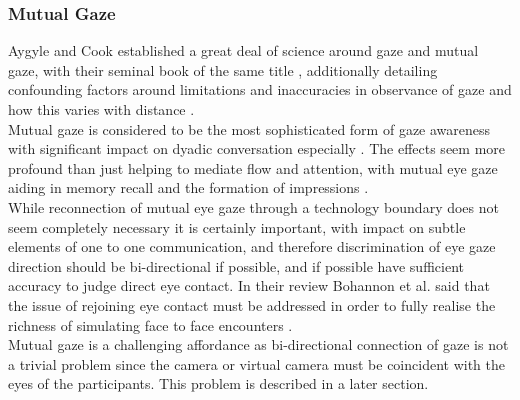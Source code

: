 \subsubsection{Mutual Gaze}
Aygyle and Cook established a great deal of science around gaze and mutual gaze, with their seminal book of the same title \cite{argyle1976gaze}, additionally detailing confounding factors around limitations and inaccuracies in observance of gaze and how this varies with distance \cite{Argyle1969} \cite{Argyle} \cite{Cook1977}.\\
Mutual gaze is considered to be the most sophisticated form of gaze awareness with significant impact on dyadic conversation especially \cite{Cook1977, Kleinke1986a, Fagel2010}. The effects seem more profound than just helping to mediate flow and attention, with mutual eye gaze aiding in memory recall and the formation of impressions \cite{Bohannon2013}.\\
While reconnection of mutual eye gaze through a technology boundary does not seem completely necessary it is certainly important, with impact on subtle elements of one to one communication, and therefore discrimination of eye gaze direction should be bi-directional if possible, and if possible have sufficient accuracy to judge direct eye contact. In their review Bohannon et al. said that the issue of rejoining eye contact must be addressed in order to fully realise the richness of simulating face to face encounters \cite{Bohannon2013}.\\
Mutual gaze is a challenging affordance as bi-directional connection of gaze is not a trivial problem since the camera or virtual camera must be coincident with the eyes of the participants. This problem is described in a later section.
